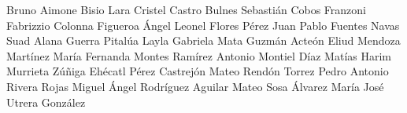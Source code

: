 Bruno Aimone Bisio Lara
Cristel Castro Bulnes
Sebastián Cobos Franzoni
Fabrizzio Colonna Figueroa
Ángel Leonel Flores Pérez
Juan Pablo Fuentes Navas
Suad Alana Guerra Pitalúa
Layla Gabriela Mata Guzmán
Acteón Eliud Mendoza Martínez
María Fernanda Montes Ramírez
Antonio Montiel Díaz
Matías Harim Murrieta Zúñiga
Ehécatl Pérez Castrejón
Mateo Rendón Torrez
Pedro Antonio Rivera Rojas
Miguel Ángel Rodríguez Aguilar
Mateo Sosa Álvarez
María José Utrera González